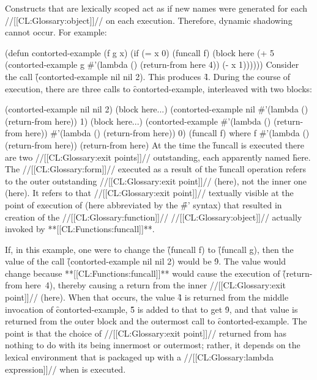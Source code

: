 Constructs that are lexically scoped act as if new names were generated for each //[[CL:Glossary:object]]// on each execution.  Therefore, dynamic shadowing cannot occur.  For example:

\code
 (defun contorted-example (f g x)
   (if (= x 0)
       (funcall f)
       (block here
          (+ 5 (contorted-example g
                                  #'(lambda () (return-from here 4))
                                  (- x 1)))))) \endcode Consider the call \f{(contorted-example nil nil 2)}.  This produces \f{4}.  During the course of execution, there are three calls to \f{contorted-example}, interleaved with two  blocks:

\code
 (contorted-example nil nil 2)
   (block here\ssso ...)
     (contorted-example nil #'(lambda () (return-from here)) 1)
       (block here\ssst ...)
         (contorted-example #'(lambda () (return-from here))
                            #'(lambda () (return-from here))
                            0)
             (funcall f)
                    where f \EV #'(lambda () (return-from here))
                 (return-from here) \endcode At the time the \f{funcall} is executed there are two  //[[CL:Glossary:exit points]]// outstanding, each apparently named \f{here}. The  //[[CL:Glossary:form]]// executed as a result of the \f{funcall} operation refers to the outer outstanding //[[CL:Glossary:exit point]]// (here\ssso), not the inner one (here\ssst). It refers to that //[[CL:Glossary:exit point]]// textually visible at the point of execution of  (here abbreviated by the \f{\#'} syntax) that resulted in creation of the //[[CL:Glossary:function]]// //[[CL:Glossary:object]]// actually invoked by  **[[CL:Functions:funcall]]**.                       

If, in this example, one were to change the \f{(funcall f)} to \f{(funcall g)}, then the value of the call \f{(contorted-example nil nil 2)} would be \f{9}.  The value would change because  **[[CL:Functions:funcall]]** would cause the execution of \f{(return-from here\ssst\ 4)}, thereby causing a return from the inner //[[CL:Glossary:exit point]]// (here\ssst). When that occurs, the value \f{4} is returned from the middle invocation of \f{contorted-example}, \f{5} is added to that to get \f{9}, and that value is returned from the outer block and the outermost call to \f{contorted-example}.  The point is that the choice of //[[CL:Glossary:exit point]]// returned from has nothing to do with its being innermost or outermost; rather, it depends on the lexical environment that is packaged up with a //[[CL:Glossary:lambda expression]]// when  is executed.
                                   \endSubsection%

